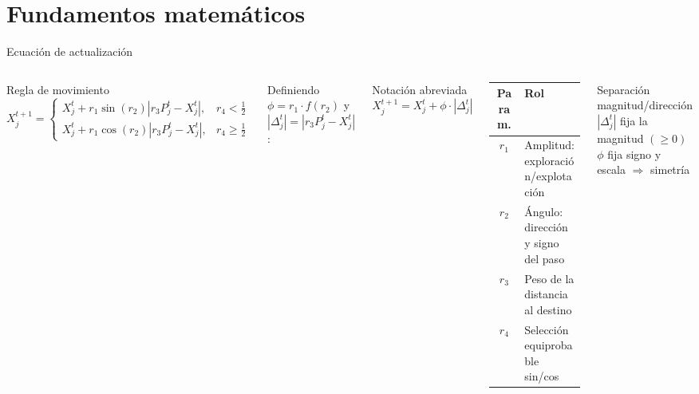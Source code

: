 \documentclass[aspectratio=169, spanish]{beamer}
\begin{document}
\section{Fundamentos matemáticos}

\begin{frame}{Ecuación de actualización}
  \begin{columns}[T, onlytextwidth]
      \begin{block}{Regla de movimiento}
        \vspace{2pt}
        \[
          X_j^{t+1} =
          \begin{cases}
            X_j^t + r_1 \sin(r_2) |r_3 P_j^t - X_j^t|, & r_4 < \tfrac{1}{2}\\[4pt]
            X_j^t + r_1 \cos(r_2) |r_3 P_j^t - X_j^t|, & r_4 \geq \tfrac{1}{2}
          \end{cases}
        \]
        \vspace{2pt}
      \end{block}
      \vspace{0.4em}
      Definiendo $\phi = r_1 \cdot f(r_2)$ y $|\Delta_j^t| = |r_3 P_j^t - X_j^t|$:
      \vspace{0.3em}
      \begin{block}{Notación abreviada}
        \centering
        $\displaystyle X_j^{t+1} = X_j^t + \phi \cdot |\Delta_j^t|$
      \end{block}

      \vspace{0.3em}
      {\small
      \begin{tabular}{c p{5.1cm}}
        \toprule
        \textbf{Param.} & \textbf{Rol} \\
        \midrule
        $r_1$ & {Amplitud}: exploración/explotación \\
        $r_2$ & Ángulo: dirección y signo del paso \\
        $r_3$ & Peso de la distancia al destino \\
        $r_4$ & Selección equiprobable sin/cos \\
        \bottomrule
      \end{tabular}}
      \vspace{0.5em}

      \begin{exampleblock}{Separación magnitud/dirección}
        \centering
        $|\Delta_j^t|$ fija la magnitud $(\geq 0)$\\
        $\phi$ fija signo y escala $\Rightarrow$ simetría
      \end{exampleblock}
  \end{columns}
\end{frame}
\end{document}

